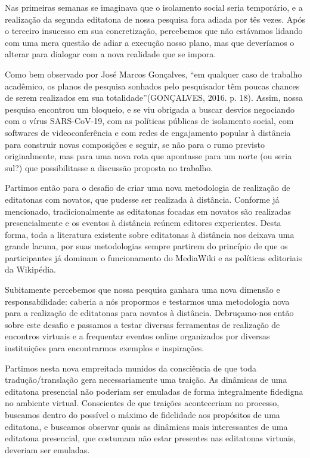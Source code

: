 Nas primeiras semanas se imaginava que o isolamento social seria temporário, e a realização da segunda editatona de nossa pesquisa fora adiada por tês vezes. Após o terceiro insucesso em sua concretização, percebemos que não estávamos lidando com uma mera questão de adiar a execução nosso plano, mas que deveríamos o alterar para dialogar com a nova realidade que se impora.

Como bem observado por José Marcos Gonçalves, ``em qualquer caso de trabalho acadêmico, os planos de pesquisa sonhados pelo pesquisador têm poucas chances de serem realizados em sua totalidade''(GONÇALVES, 2016. p. 18). Assim, nossa pesquisa encontrou um bloqueio, e se viu obrigada a buscar desvios negociando com o vírus SARS-CoV-19, com as políticas públicas de isolamento social, com softwares de videoconferência e com redes de engajamento popular à distância para construir novas composições e seguir, se não para o rumo previsto originalmente, mas para uma nova rota que apontasse para um norte (ou seria sul?) que possibilitasse a discussão proposta no trabalho.

Partimos então para o desafio de criar uma nova metodologia de realização de editatonas com novatos, que pudesse ser realizada à distância. Conforme já mencionado, tradicionalmente as editatonas focadas em novatos são realizadas presencialmente e os eventos à distância reúnem editores experientes. Desta forma, toda a literatura existente sobre editatonas à distância nos deixava uma grande lacuna, por suas metodologias sempre partirem do princípio de que os participantes já dominam o funcionamento do MediaWiki e as políticas editoriais da Wikipédia.

Subitamente percebemos que nossa pesquisa ganhara uma nova dimensão e responsabilidade: caberia a nós propormos e testarmos uma metodologia nova para a realização de editatonas para novatos à distância. Debruçamo-nos então sobre este desafio e passamos a testar diversas ferramentas de realização de encontros virtuais e a frequentar eventos online organizados por diversas instituições para encontrarmos exemplos e inspirações.

Partimos nesta nova empreitada munidos da consciência de que toda tradução/translação gera necessariamente uma traição. As dinâmicas de uma editatona presencial não poderiam ser emuladas de forma integralmente fidedigna no ambiente virtual. Conscientes de que traições aconteceriam no processo, buscamos dentro do possível o máximo de fidelidade aos propósitos de uma editatona, e buscamos observar quais as dinâmicas mais interessantes de uma editatona presencial, que costumam não estar presentes nas editatonas virtuais, deveriam ser emuladas.

